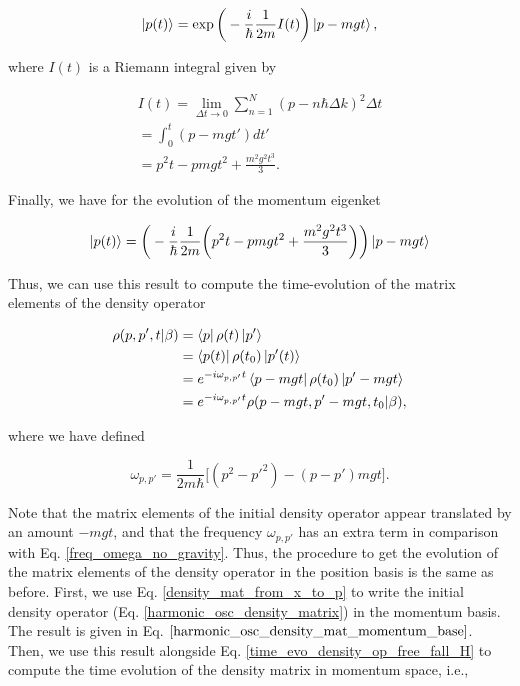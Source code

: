 \documentclass{article}
\begin{document}
\begin{equation}
    \ket{p(t)} = \exp \bigg(- \frac{i}{\hbar} \frac{1}{2m} I(t) \bigg) \ket{p-mgt},
\end{equation}

where $I(t)$ is a Riemann integral given by

\begin{equation}
    \begin{split}
        I(t) = \lim_{\Delta t \to 0} \sum_{n=1}^{N} (p- n\hbar \Delta k)^{2} \Delta t \\ = \int_{0}^{t}(p-mgt')dt' \\ = p^{2}t - pmgt^{2} + \frac{m^{2} g^{2} t^{3}}{3}.
    \end{split}
\end{equation}

Finally, we have for the evolution of the momentum eigenket

\begin{equation}
    \ket{p(t)} = \bigg( -\frac{i}{\hbar} \frac{1}{2m} \bigg(p^{2}t - pmgt^{2} + \frac{m^{2} g^{2} t^{3}}{3}\bigg) \bigg) \ket{p -mgt}
\end{equation}

Thus, we can use this result to compute the time-evolution of the matrix elements of the density operator

\begin{equation}\label{time_evo_density_op_free_fall_H}
    \begin{aligned}
        \rho(p,p',t|\beta) & = \bra{p} \rho (t) \ket{p'} \\ & = \bra{p(t)} \rho (t_{0}) \ket{p'(t)} \\ & = e^{-i\omega_{p,p'} t} \bra{p-mgt} \rho(t_{0}) \ket{p'-mgt} \\ & = e^{-i\omega_{p,p'} t} \rho (p-mgt, p'-mgt,t_{0}|\beta),
    \end{aligned}
\end{equation}

where we have defined

\begin{equation}
    \omega_{p,p'} = \frac{1}{2m\hbar} \big[ (p^{2}-p'^{2})-(p-p')mgt \big].
\end{equation}

Note that the matrix elements of the initial density operator appear translated by an amount $-mgt$, and that the frequency $\omega_{p,p'}$ has an extra term in comparison with Eq. \ref{freq_omega_no_gravity}. Thus, the procedure to get the evolution of the matrix elements of the density operator in the position basis is the same as before. First, we use Eq. \ref{density_mat_from_x_to_p} to write the initial density operator (Eq. \ref{harmonic_osc_density_matrix}) in the momentum basis. The result is given in Eq. $\ref{harmonic_osc_density_mat_momentum_base}$. Then, we use this result alongside Eq. \ref{time_evo_density_op_free_fall_H} to compute the time evolution of the density matrix in momentum space, i.e.,
\end{document}
